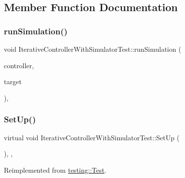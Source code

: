 \subsection{Member Function Documentation}
\mbox{\label{classIterativeControllerWithSimulatorTest_a963a8dbc0e4c01b83a7372766be2f111}} 
\subsubsection{\texorpdfstring{runSimulation()}{runSimulation()}}
{\footnotesize\ttfamily void Iterative\+Controller\+With\+Simulator\+Test\+::run\+Simulation (\begin{DoxyParamCaption}\item[{\mbox{\hyperlink{classokapi_1_1IterativeController}{Iterative\+Controller}}$<$ double, double $>$ \&}]{controller,  }\item[{const double}]{target }\end{DoxyParamCaption})\hspace{0.3cm}{\ttfamily [inline]}, {\ttfamily [protected]}}

\mbox{\label{classIterativeControllerWithSimulatorTest_af79613c99a52d765087216edbf4c9d59}} 
\subsubsection{\texorpdfstring{SetUp()}{SetUp()}}
{\footnotesize\ttfamily virtual void Iterative\+Controller\+With\+Simulator\+Test\+::\+Set\+Up (\begin{DoxyParamCaption}{ }\end{DoxyParamCaption})\hspace{0.3cm}{\ttfamily [inline]}, {\ttfamily [protected]}, {\ttfamily [virtual]}}



Reimplemented from \mbox{\hyperlink{classtesting_1_1Test_a190315150c303ddf801313fd1a777733}{testing\+::\+Test}}.



